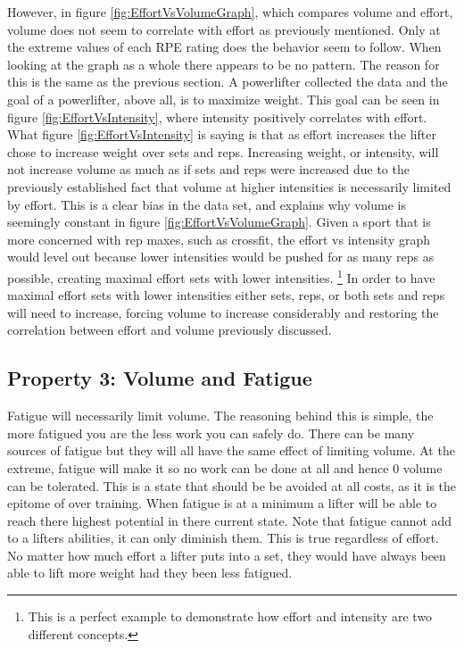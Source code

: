 However, in figure \ref{fig:EffortVsVolumeGraph}, which compares volume and effort, volume does not seem to correlate with effort as previously mentioned. Only at the extreme values of each RPE rating does the behavior seem to follow. When looking at the graph as a whole there appears to be no pattern. The reason for this is the same as the previous section. A powerlifter collected the data and the goal of a powerlifter, above all, is to maximize weight. This goal can be seen in figure \ref{fig:EffortVsIntensity}, where intensity positively correlates with effort. What figure \ref{fig:EffortVsIntensity} is saying is that as effort increases the lifter chose to increase weight over sets and reps. Increasing weight, or intensity, will not increase volume as much as if sets and reps were increased due to the previously established fact that volume at higher intensities is necessarily limited by effort. This is a clear bias in the data set, and explains why volume is seemingly constant in figure \ref{fig:EffortVsVolumeGraph}. Given a sport that is more concerned with rep maxes, such as crossfit, the effort vs intensity graph would level out because lower intensities would be pushed for as many reps as possible, creating maximal effort sets with lower intensities. \footnote{This is a perfect example to demonstrate how effort and intensity are two different concepts.} In order to have maximal effort sets with lower intensities either sets, reps, or both sets and reps will need to increase, forcing volume to increase considerably and restoring the correlation between effort and volume previously discussed.


\subsection{Property 3: Volume and Fatigue}
\label{sec:PotentialSurfaceIntuitiveRelationshipsBetweenVariablesVolumeAndFatigue}

Fatigue will necessarily limit volume. The reasoning behind this is simple, the more fatigued you are the less work you can safely do. There can be many sources of fatigue but they will all have the same effect of limiting volume. At the extreme, fatigue will make it so no work can be done at all and hence $0$ volume can be tolerated. This is a state that should be be avoided at all costs, as it is the epitome of over training. When fatigue is at a minimum a lifter will be able to reach there highest potential in there current state. Note that fatigue cannot add to a lifters abilities, it can only diminish them. This is true regardless of effort. No matter how much effort a lifter puts into a set, they would have always been able to lift more weight had they been less fatigued.


